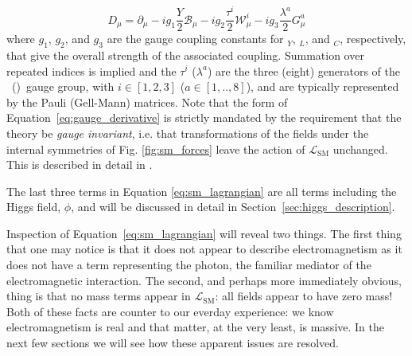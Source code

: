 \begin{equation}
	\mathit{D}_{\mu} = \partial_{\mu} - i g_1 \frac{Y}{2} \mathcal{B}_{\mu} - i g_2 \frac{\tau^i}{2} \mathcal{W}_{\mu}^i - i g_3 \frac{\lambda^a}{2} G_{\mu}^a
	\label{eq:gauge_derivative}
\end{equation}
where $g_1$, $g_2$, and $g_3$ are the gauge coupling constants for \Uone$_{Y}$, \SUtwo$_{L}$, and \SUthree$_{C}$, respectively, that give the overall strength of the associated coupling.
Summation over repeated indices is implied and the $\tau^i$ ($\lambda^a$) are the three (eight)
generators of the \SUtwo~(\SUthree)~gauge group, with $i \in [1,2,3]$ ($a \in [1,..,8]$), and
are typically represented by the Pauli (Gell-Mann) matrices. Note that the form of Equation~\ref{eq:gauge_derivative} is strictly mandated by the requirement that the theory
be \textit{gauge invariant}, i.e. that transformations of the fields under the internal symmetries
of Fig. \ref{fig:sm_forces} leave the action of $\mathcal{L}_{\text{SM}}$ unchanged. This is described in detail
in {\color{red}{Appendix XXX}}.

The last three terms in Equation \ref{eq:sm_lagrangian} are all terms including the Higgs field, $\phi$,
and will be discussed in detail in Section~\ref{sec:higgs_description}.

Inspection of Equation~\ref{eq:sm_lagrangian} will reveal two things. The first thing that one
may notice is that it does not appear to describe electromagnetism as it does not have a
term representing the photon, the familiar mediator of the electromagnetic interaction.
The second, and perhaps more immediately obvious, thing is that no mass terms
appear in $\mathcal{L}_{\text{SM}}$: all fields appear to have zero mass! Both of these
facts are counter to our everday experience: we know electromagnetism is real and that matter,
at the very least, is massive. In the next few sections we will see how these apparent
issues are resolved.


\FloatBarrier



